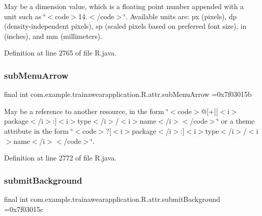 May be a dimension value, which is a floating point number appended with a unit such as \char`\"{}$<$code$>$14.\+5sp$<$/code$>$\char`\"{}. Available units are\+: px (pixels), dp (density-\/independent pixels), sp (scaled pixels based on preferred font size), in (inches), and mm (millimeters). 

Definition at line 2765 of file R.\+java.

\mbox{\label{classcom_1_1example_1_1trainawearapplication_1_1_r_1_1attr_a3fb7a4acfae4963d8dbcdc217db72525}} 
\subsubsection{\texorpdfstring{subMenuArrow}{subMenuArrow}}
{\footnotesize\ttfamily final int com.\+example.\+trainawearapplication.\+R.\+attr.\+sub\+Menu\+Arrow =0x7f03015b\hspace{0.3cm}{\ttfamily [static]}}

May be a reference to another resource, in the form \char`\"{}$<$code$>$@\mbox{[}+\mbox{]}\mbox{[}$<$i$>$package$<$/i$>$\+:\mbox{]}$<$i$>$type$<$/i$>$/$<$i$>$name$<$/i$>$$<$/code$>$\char`\"{} or a theme attribute in the form \char`\"{}$<$code$>$?\mbox{[}$<$i$>$package$<$/i$>$\+:\mbox{]}$<$i$>$type$<$/i$>$/$<$i$>$name$<$/i$>$$<$/code$>$\char`\"{}. 

Definition at line 2772 of file R.\+java.

\mbox{\label{classcom_1_1example_1_1trainawearapplication_1_1_r_1_1attr_ae845d7e93eec450d109ae369c4fd2baf}} 
\subsubsection{\texorpdfstring{submitBackground}{submitBackground}}
{\footnotesize\ttfamily final int com.\+example.\+trainawearapplication.\+R.\+attr.\+submit\+Background =0x7f03015c\hspace{0.3cm}{\ttfamily [static]}}

